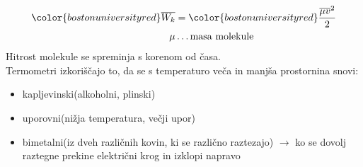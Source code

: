 \\
\begin{align*}
	{\color{bostonuniversityred}\overline{W_k}} &= {\color{bostonuniversityred}\frac{\overline{\mu}\overline{v}^2}{2}}\\
	\mu & \dots \text{masa molekule}\\
\end{align*}
Hitrost molekule se spreminja s korenom od časa.\\
Termometri izkoriščajo to, da se s temperaturo veča in manjša prostornina snovi:\\
\begin{itemize}
	\item kapljevinski(alkoholni, plinski)
	\item uporovni(nižja temperatura, večji upor)
	\item bimetalni(iz dveh različnih kovin, ki se različno raztezajo) $\rightarrow$ ko se dovolj raztegne prekine električni krog in izklopi napravo
\end{itemize}
